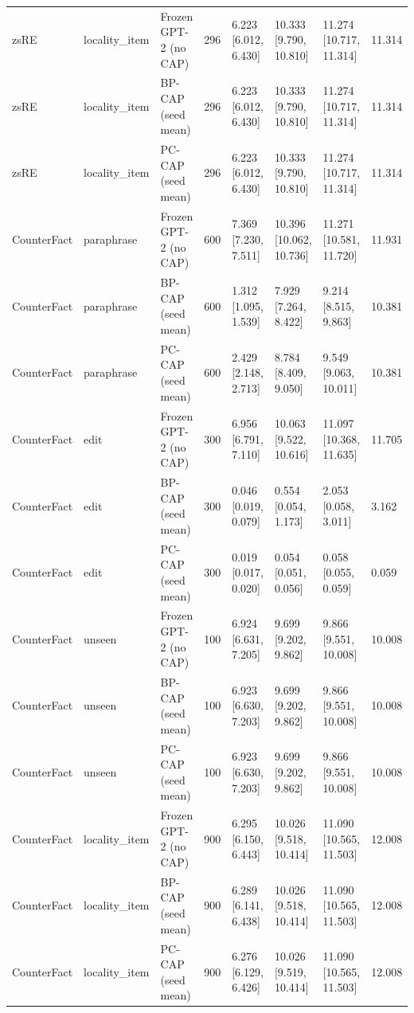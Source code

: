 \documentclass[10pt,a4paper]{article}
\begin{document}
\begin{center}
\begin{tabularx}{\textwidth}{@{}p{}XXXXXXX@{}}
zsRE & locality\_item & Frozen GPT-2 (no CAP) & 296 & 6.223 [6.012, 6.430] & 10.333 [9.790, 10.810] & 11.274 [10.717, 11.314] & 11.314 \\
zsRE & locality\_item & BP-CAP (seed mean) & 296 & 6.223 [6.012, 6.430] & 10.333 [9.790, 10.810] & 11.274 [10.717, 11.314] & 11.314 \\
zsRE & locality\_item & PC-CAP (seed mean) & 296 & 6.223 [6.012, 6.430] & 10.333 [9.790, 10.810] & 11.274 [10.717, 11.314] & 11.314 \\
CounterFact & paraphrase & Frozen GPT-2 (no CAP) & 600 & 7.369 [7.230, 7.511] & 10.396 [10.062, 10.736] & 11.271 [10.581, 11.720] & 11.931 \\
CounterFact & paraphrase & BP-CAP (seed mean) & 600 & 1.312 [1.095, 1.539] & 7.929 [7.264, 8.422] & 9.214 [8.515, 9.863] & 10.381 \\
CounterFact & paraphrase & PC-CAP (seed mean) & 600 & 2.429 [2.148, 2.713] & 8.784 [8.409, 9.050] & 9.549 [9.063, 10.011] & 10.381 \\
CounterFact & edit & Frozen GPT-2 (no CAP) & 300 & 6.956 [6.791, 7.110] & 10.063 [9.522, 10.616] & 11.097 [10.368, 11.635] & 11.705 \\
CounterFact & edit & BP-CAP (seed mean) & 300 & 0.046 [0.019, 0.079] & 0.554 [0.054, 1.173] & 2.053 [0.058, 3.011] & 3.162 \\
CounterFact & edit & PC-CAP (seed mean) & 300 & 0.019 [0.017, 0.020] & 0.054 [0.051, 0.056] & 0.058 [0.055, 0.059] & 0.059 \\
CounterFact & unseen & Frozen GPT-2 (no CAP) & 100 & 6.924 [6.631, 7.205] & 9.699 [9.202, 9.862] & 9.866 [9.551, 10.008] & 10.008 \\
CounterFact & unseen & BP-CAP (seed mean) & 100 & 6.923 [6.630, 7.203] & 9.699 [9.202, 9.862] & 9.866 [9.551, 10.008] & 10.008 \\
CounterFact & unseen & PC-CAP (seed mean) & 100 & 6.923 [6.630, 7.203] & 9.699 [9.202, 9.862] & 9.866 [9.551, 10.008] & 10.008 \\
CounterFact & locality\_item & Frozen GPT-2 (no CAP) & 900 & 6.295 [6.150, 6.443] & 10.026 [9.518, 10.414] & 11.090 [10.565, 11.503] & 12.008 \\
CounterFact & locality\_item & BP-CAP (seed mean) & 900 & 6.289 [6.141, 6.438] & 10.026 [9.518, 10.414] & 11.090 [10.565, 11.503] & 12.008 \\
CounterFact & locality\_item & PC-CAP (seed mean) & 900 & 6.276 [6.129, 6.426] & 10.026 [9.519, 10.414] & 11.090 [10.565, 11.503] & 12.008 \\

\end{tabularx}
\end{center}
\end{document}
